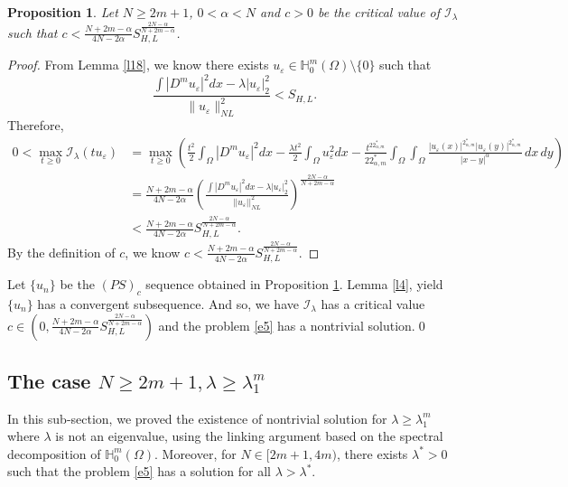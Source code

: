 \documentclass[reqno]{amsart}
\newtheorem{proposition}[theorem]{Proposition}
\newcommand{\DD} {\displaystyle}
\newcommand{\la} {\lambda}
\newcommand{\eps}{\varepsilon}
\newcommand{\Om}{\Omega}
\newcommand{\al} {\alpha}
\newcommand{\noi} {  \noindent}
\newcommand{\mb} {\mathbb}
\newcommand{\mc} {\mathcal}
\numberwithin{theorem}{section} \numberwithin{equation}{section}
\begin{document}
\begin{proposition} \label{p3}
Let $N\geq2m+1$, $0<\al<N$ and $c>0$ be the critical value of $\mc{I_\la}$ such that
$c<\frac{N+2m-\al}{4N-2\al} S_{H, L}^{\frac{2N-\al}{N+2m-\al}}$.
\end{proposition}
\begin{proof}
From Lemma \ref{l18}, we know there exists $u_{\eps}\in \mb{H}_0^{m}(\Om)\setminus\{0\}$ such that 
\[\frac{\int|D^m u_{\eps}|^2 dx-\la |u_{\eps}|^2_2}{\|u_{\eps}\|^2_{NL}}<S_{H, L}.\]
Therefore,
\begin{align*}
0<\max_{t\geq0}\mc{I}_\la(tu_{\eps})&=\max_{t\geq0}\left(\frac{t^2}{2}\int_{\Om}|D^m u_{\eps}|^2dx-\frac{\la t^2}{2}\int_{\Om}u_{\eps}^2dx-\frac{t^{22^*_{\al, m}}}{22^*_{\al, m}}\int_\Om\int_\Om\frac{|u_{\eps}(x)|^{2^*_{\al, m}}|u_{\eps}(y)|^{2^*_{\al, m}}}{|x-y|^\al} \, dx \, dy\right)\\
&=\frac{N+2m-\al}{4N-2\al}\left(\frac{\DD \int|D^m u_{\eps}|^2 dx-\la |u_{\eps}|^2_2}{||u_{\eps}||^2_{NL}}\right)^\frac{2N-\al}{N+2m-\al}\\
&<\frac{N+2m-\al}{4N-2\al}S^\frac{2N-\al}{N+2m-\al}_{H, L}.
\end{align*}
By the definition of $c$, we know $c<\frac{N+2m-\al}{4N-2\al}S^\frac{2N-\al}{N+2m-\al}_{H, L}$.
\end{proof}
\vspace{0.2cm}
\noi {\bf{Proof of Theorem \ref{t4}-(1)}}
Let $\{u_n\}$ be the $(PS)_c$ sequence obtained in Proposition \ref{p3}. Lemma \ref{l4}, yield $\{u_n\}$ has a convergent subsequence. And so, we have $\mc{I}_\la$ has a critical value $c\in\left(0, \frac{N+2m-\al}{4N-2\al}S^\frac{2N-\al}{N+2m-\al}_{H,L}\right)$ and the problem \eqref{e5} has a nontrivial solution.\qed


\subsection{\bf{The case \texorpdfstring{$N \geq 2m+1, \la \geq \la^m_1$}{}}}  In this sub-section, we proved the existence of nontrivial solution for $\la\geq\la^m_1$ where $\la$ is not an eigenvalue, using the linking argument based on the spectral decomposition of $\mb{H}_0^{m}(\Om)$.
Moreover, for $N\in[2m+1, 4m)$, there exists $\la^{*}>0$ such that the problem \eqref{e5} has a solution for all $\la>\la^{*}$.
\end{document}
